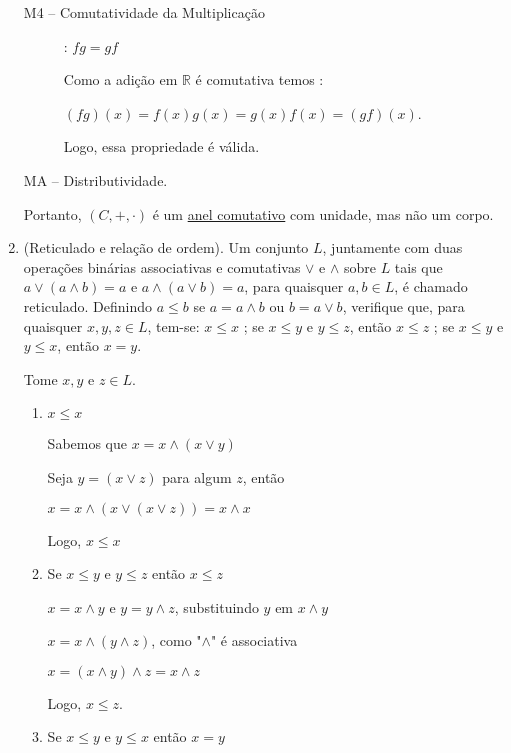 \documentclass[a4paper,12pt]{article}
\begin{document}
\begin{enumerate}[label=1.\arabic*.]
\begin{description}
      \item[M4 -- Comutatividade da Multiplicação] : $fg = gf$
      
      Como a adição em $\mathbb{R}$ é comutativa temos :

      $(fg)(x) = f(x)g(x) = g(x)f(x) = (gf)(x)$.
      
      Logo, essa propriedade é válida. 

      \item[MA -- Distributividade.]  
        
    \end{description}

    Portanto, $(C,+,\cdot)$ é um \underline{anel comutativo} com unidade, mas não um corpo.

    \item (Reticulado e relação de ordem). Um conjunto $L$, juntamente com duas operações 
    binárias associativas e comutativas $\vee$ e $\wedge$ sobre $L$ tais que 
    $a\vee(a\wedge b)=a$ e $a\wedge(a\vee b)=a$, para quaisquer $a,b\in L$, é chamado reticulado. 
    Definindo $a\le b$ se $a=a\wedge b$ ou $b=a\vee b$, verifique que, para quaisquer $x,y,z\in L$, tem-se:
    $x \le x$ ; se $x \le y$ e $y \le z$, então $x\le z$ ; se $x \le y$ e $y \le x$, então $x=y$.
    
    Tome $x,y \text{ e } z \in L$.
    
    \begin{enumerate}[label=\roman*.]
      \item $x \leq x$
      
      Sabemos que $x = x \wedge (x \vee y)$
      
      Seja $y = (x \vee z)$ para algum $z$, então

      $x = x \wedge (x \vee (x \vee z)) = x \wedge x$

      Logo, $x \leq x$

      \item Se $x \leq y \text{ e } y \leq z$ então $x \leq z$
      
      $x = x \wedge y$ e $y = y \wedge z$, substituindo $y$ em $x \wedge y$

      $x = x \wedge (y \wedge z)$, como "$\wedge$" é associativa

      $x = (x \wedge y) \wedge z = x \wedge z$
      
      Logo, $x \leq z$.

      \item Se $x \leq y \text{ e } y \leq x$ então $x = y$
    

\end{enumerate}
\end{enumerate}
\end{document}
